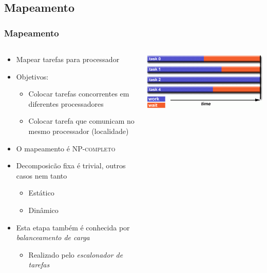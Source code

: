 \documentclass[xcolor={usenames,dvipsnames},12pt,presentation,aspectratio=169]{beamer}
\begin{document}
\subsection{Mapeamento}
\begin{frame}
  \frametitle{Mapeamento}
  \vspace{-2mm}
   \begin{columns}
     \begin{column}{0.6\textwidth}
      \begin{itemize}
        \item Mapear tarefas para processador
        \item Objetivos:
          \begin{itemize}
            \item Colocar tarefas concorrentes em diferentes processadores
            \item Colocar tarefa que comunicam no mesmo processador (localidade)
          \end{itemize}
        \item O mapeamento é \textsc{NP-completo}
        \item Decomposicão fixa é trivial, outros casos nem tanto
          \begin{itemize}
            \item Estático 
            \item Dinâmico
          \end{itemize}
      \item Esta etapa também é conhecida por \emph{balanceamento de carga}
          \begin{itemize}
            \item Realizado pelo \emph{escalonador de tarefas}
          \end{itemize}
      \end{itemize}
     \end{column}
     \begin{column}{0.4\textwidth}
        \begin{center}
        \includegraphics[width=\textwidth]{load_bal1.png}
        \end{center}
     \end{column}
   \end{columns}
\end{frame}
\end{document}
